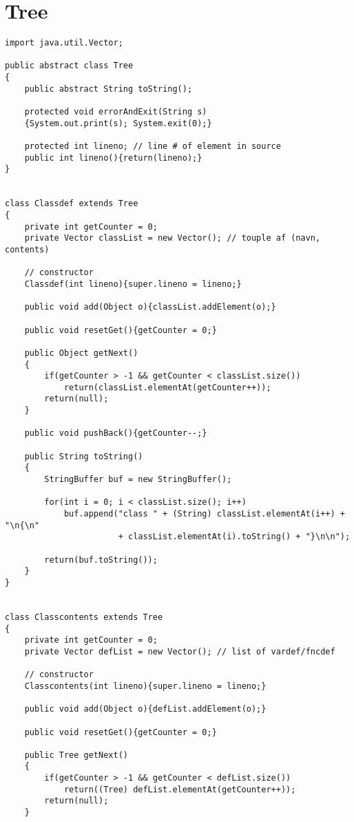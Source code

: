 \chapter{Tree}
\label{a:tree}
\OverviewLineNoTitle
\begin{footnotesize}\begin{verbatim}
import java.util.Vector;

public abstract class Tree
{
    public abstract String toString();    
    
    protected void errorAndExit(String s)
    {System.out.print(s); System.exit(0);}
    
    protected int lineno; // line # of element in source
    public int lineno(){return(lineno);}
}


class Classdef extends Tree
{
    private int getCounter = 0;
    private Vector classList = new Vector(); // touple af (navn, contents)
    
    // constructor
    Classdef(int lineno){super.lineno = lineno;}
    
    public void add(Object o){classList.addElement(o);}
    
    public void resetGet(){getCounter = 0;}
        
    public Object getNext()
    {
        if(getCounter > -1 && getCounter < classList.size())
            return(classList.elementAt(getCounter++));
        return(null);
    }
    
    public void pushBack(){getCounter--;}
    
    public String toString()
    {
        StringBuffer buf = new StringBuffer();
        
        for(int i = 0; i < classList.size(); i++)    
            buf.append("class " + (String) classList.elementAt(i++) + "\n{\n"
                       + classList.elementAt(i).toString() + "}\n\n");
        
        return(buf.toString());
    }
}        


class Classcontents extends Tree
{
    private int getCounter = 0;
    private Vector defList = new Vector(); // list of vardef/fncdef
    
    // constructor
    Classcontents(int lineno){super.lineno = lineno;}
    
    public void add(Object o){defList.addElement(o);}

    public void resetGet(){getCounter = 0;}
        
    public Tree getNext()
    {
        if(getCounter > -1 && getCounter < defList.size())
            return((Tree) defList.elementAt(getCounter++));
        return(null);
    }
    

\end{verbatim}
\end{footnotesize}
